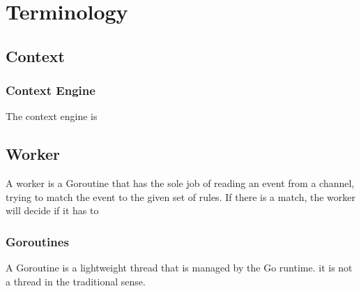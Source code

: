\section{Terminology}
\subsection{Context}
\subsubsection{Context Engine}

The context engine is 

\subsection{Worker}

A worker is a Goroutine that has the sole job of reading an event from a channel, trying to match the event to the given set of rules. If there is a match, the worker will decide if it has to 

\subsubsection{Goroutines}

A Goroutine is a lightweight thread that is managed by the Go runtime. it is not a thread in the traditional sense.


